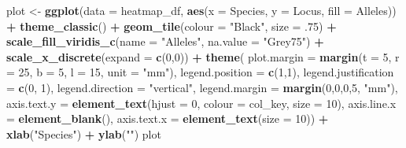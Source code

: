 \documentclass[]{article}
\newenvironment{Shaded}{\begin{snugshade}}{\end{snugshade}}
\newcommand{\KeywordTok}[1]{\textcolor[rgb]{0.13,0.29,0.53}{\textbf{#1}}}
\newcommand{\DataTypeTok}[1]{\textcolor[rgb]{0.13,0.29,0.53}{#1}}
\newcommand{\DecValTok}[1]{\textcolor[rgb]{0.00,0.00,0.81}{#1}}
\newcommand{\StringTok}[1]{\textcolor[rgb]{0.31,0.60,0.02}{#1}}
\newcommand{\OperatorTok}[1]{\textcolor[rgb]{0.81,0.36,0.00}{\textbf{#1}}}
\newcommand{\NormalTok}[1]{#1}
\begin{document}
\begin{Shaded}
\begin{Highlighting}[]
\NormalTok{plot <-}\StringTok{ }\KeywordTok{ggplot}\NormalTok{(}\DataTypeTok{data =}\NormalTok{ heatmap_df, }\KeywordTok{aes}\NormalTok{(}\DataTypeTok{x =}\NormalTok{ Species, }\DataTypeTok{y =}\NormalTok{ Locus, }\DataTypeTok{fill =}\NormalTok{ Alleles)) }\OperatorTok{+}
\StringTok{  }\KeywordTok{theme_classic}\NormalTok{() }\OperatorTok{+}
\StringTok{  }\KeywordTok{geom_tile}\NormalTok{(}\DataTypeTok{colour =} \StringTok{"Black"}\NormalTok{, }\DataTypeTok{size =}\NormalTok{ .}\DecValTok{75}\NormalTok{) }\OperatorTok{+}\StringTok{ }
\StringTok{  }\KeywordTok{scale_fill_viridis_c}\NormalTok{(}\DataTypeTok{name =} \StringTok{"Alleles"}\NormalTok{, }\DataTypeTok{na.value =} \StringTok{"Grey75"}\NormalTok{) }\OperatorTok{+}
\StringTok{  }\KeywordTok{scale_x_discrete}\NormalTok{(}\DataTypeTok{expand =} \KeywordTok{c}\NormalTok{(}\DecValTok{0}\NormalTok{,}\DecValTok{0}\NormalTok{)) }\OperatorTok{+}
\StringTok{  }\KeywordTok{theme}\NormalTok{(}
    \DataTypeTok{plot.margin =} \KeywordTok{margin}\NormalTok{(}\DataTypeTok{t =} \DecValTok{5}\NormalTok{, }\DataTypeTok{r =} \DecValTok{25}\NormalTok{, }\DataTypeTok{b =} \DecValTok{5}\NormalTok{, }\DataTypeTok{l =} \DecValTok{15}\NormalTok{, }\DataTypeTok{unit =} \StringTok{"mm"}\NormalTok{),}
    \DataTypeTok{legend.position =} \KeywordTok{c}\NormalTok{(}\DecValTok{1}\NormalTok{,}\DecValTok{1}\NormalTok{), }
    \DataTypeTok{legend.justification =} \KeywordTok{c}\NormalTok{(}\DecValTok{0}\NormalTok{, }\DecValTok{1}\NormalTok{),}
    \DataTypeTok{legend.direction =} \StringTok{"vertical"}\NormalTok{,}
    \DataTypeTok{legend.margin =} \KeywordTok{margin}\NormalTok{(}\DecValTok{0}\NormalTok{,}\DecValTok{0}\NormalTok{,}\DecValTok{0}\NormalTok{,}\DecValTok{5}\NormalTok{, }\StringTok{"mm"}\NormalTok{),}
    \DataTypeTok{axis.text.y =} \KeywordTok{element_text}\NormalTok{(}\DataTypeTok{hjust =} \DecValTok{0}\NormalTok{, }\DataTypeTok{colour =}\NormalTok{ col_key, }\DataTypeTok{size =} \DecValTok{10}\NormalTok{),}
    \DataTypeTok{axis.line.x =} \KeywordTok{element_blank}\NormalTok{(),}
    \DataTypeTok{axis.text.x =} \KeywordTok{element_text}\NormalTok{(}\DataTypeTok{size =} \DecValTok{10}\NormalTok{)) }\OperatorTok{+}\StringTok{ }
\StringTok{  }\KeywordTok{xlab}\NormalTok{(}\StringTok{"Species"}\NormalTok{) }\OperatorTok{+}
\StringTok{  }\KeywordTok{ylab}\NormalTok{(}\StringTok{""}\NormalTok{) }
\NormalTok{plot}
\end{Highlighting}
\end{Shaded}
\end{document}
